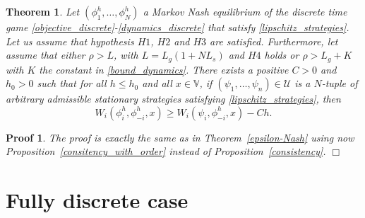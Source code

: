 \documentclass[12pt]{article}
\newtheorem{theorem}{Theorem}
\newtheorem{Proof}{Proof}
\newenvironment{proof}{\begin{Proof}\rm}{\hfill $\Box$ \end{Proof}}
\begin{document}
\begin{theorem}\label{th4}
Let $(\phi_1^h,\dots,\phi_N^h)$  a Markov Nash equilibrium of the discrete time game
\eqref{objective_discrete}-\eqref{dynamics_discrete} that satisfy \eqref{lipschitz_strategies}. Let us assume that hypothesis $H1$, $H2$ and $H3$ are satisfied. Furthermore, let assume that either  $\rho> L$, with $L=L_g(1+NL_s)$ and $H4$ holds or {$\rho>L_g+K$} with $K$ the constant in \eqref{bound_dynamics}.
 There exists a
positive $C>0$ and $h_0>0$ such that for all $h\le h_0$ and all $x\in\mathbb{V}$, if $(\psi_1,\dots,\psi_n)\in\mathcal{U}$ is a $N$-tuple of arbitrary admissible stationary strategies satisfying \eqref{lipschitz_strategies}, then
\begin{equation*}
W_{i}(\phi_i^h,\phi_{-i}^h,x)\ge W_{i}(\psi_i,\phi_{-i}^h,x)-C h.
\end{equation*}
\end{theorem}
\begin{proof} The proof is  exactly the same as in Theorem~\ref{epsilon-Nash} using now Proposition~\ref{consitency_with_order} instead of Proposition~\ref{consistency}.
\end{proof}
\section{Fully discrete case}
\end{document}
